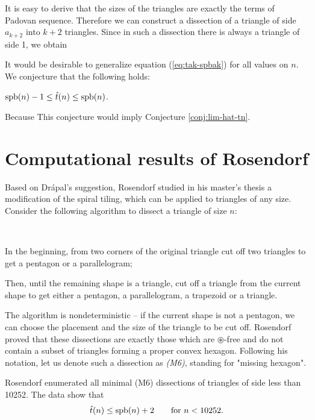 It is easy to derive that the sizes of the triangles are exactly the terms of Padovan sequence. Therefore we can construct a dissection of a triangle of side $a_{k+2}$ into $k+2$ triangles. Since in such a dissection there is always a triangle of side 1, we obtain
%

It would be desirable to generalize equation (\ref{eq:tak-spbak}) for all values on $n$. We conjecture that the following holds:
\begin{conj}
$\mathop{\mathrm{spb}}(n)-1 \leq \hat t(n) \leq \mathop{\mathrm{spb}}(n)$.
\end{conj}%

\noindent
Because
%
This conjecture would imply Conjecture \ref{conj:lim-hat-tn}.

\section{Computational results of Rosendorf}
Based on Drápal's suggestion, Rosendorf studied in his master's thesis \cite{Rosendorf04} a modification of the spiral tiling, which can be applied to triangles of any size. Consider the following algorithm to dissect a triangle of size $n$:

\begin{alg} \ 
	\begin{cosyitemize}
		\item In the beginning, from two corners of the original triangle cut off two triangles to get a pentagon or a parallelogram;
		\item Then, until the remaining shape is a triangle, cut off a triangle from the current shape to get either a pentagon, a parallelogram, a trapezoid or a triangle.
	\end{cosyitemize}
\end{alg}%

The algorithm is nondeterministic -- if the current shape is not a pentagon, we can choose the placement and the size of the triangle to be cut off. Rosendorf proved that these dissections are exactly those which are $\circledast$-free and do not contain a subset of triangles forming a proper convex hexagon. Following his notation, let us denote such a dissection as \emph{(M6)}, standing for "missing hexagon".

Rosendorf enumerated all minimal (M6) dissections of triangles of side less than 10252. The data show that
\begin{align}
	\hat{t}(n) \leq \mathop{\mathrm{spb}}(n)+2 \qquad\hbox{for $n < 10252$.}
\end{align}

